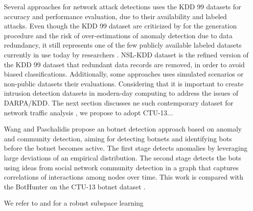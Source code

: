 \documentclass[review]{elsarticle}
\begin{document}
Several approaches for network attack detections uses the KDD 99 \cite{ji2016multi,ahmed2016survey,osanaiye2016distributed,bhuyan2014network} datasets for accuracy and performance evaluation, due to their availability and labeled attacks. Even though the KDD 99 dataset are criticized by for the generation procedure and the risk of over-estimations of anomaly detection due to data redundancy, it still represents one of the few publicly available labeled datasets currently in use today by researchers \cite{osanaiye2016distributed,bhuyan2014network}. NSL-KDD \cite{tavallaee2009detailed} dataset is the refined version of the KDD 99 dataset that redundant data records are removed, in order to avoid biased classifications. Additionally, some approaches uses simulated \cite{callegari2011novel} scenarios or non-public datasets their evaluations. Considering that it is important to create intrusion detection datasets in modern-day computing to address the issues of DARPA/KDD. The next section discusses ne such contemporary dataset for network traffic analysis \cite{ahmed2016survey}, we propose to adopt CTU-13...

Wang and Paschalidis \cite{wang2017botnet} propose an botnet detection approach based on anomaly and community detection, aiming for detecting botnets and identifying bots before the botnet becomes active. The first stage detects anomalies by leveraging large deviations of an empirical distribution. The second stage detects the bots using ideas from social network community detection in a graph that captures correlations of interactions among nodes over time. This work is compared with the BotHunter \cite{gu2007bothunter} on the CTU-13 botnet dataset \cite{garcia2014empirical}.


We refer to \cite{lerman2018overview} and \cite{vaswani2018robust} for a robust subspace learning 
\end{document}

